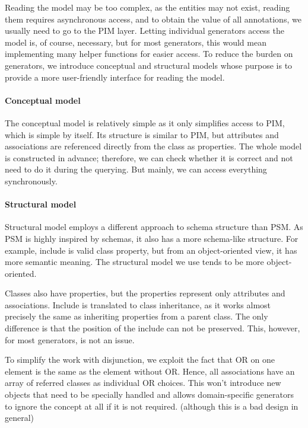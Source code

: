 Reading the model may be too complex, as the entities may not exist, reading them requires asynchronous access, and to obtain the value of all annotations, we usually need to go to the PIM layer. Letting individual generators access the model is, of course, necessary, but for most generators, this would mean implementing many helper functions for easier access. To reduce the burden on generators, we introduce conceptual and structural models whose purpose is to provide a more user-friendly interface for reading the model.

\paragraph{Conceptual model} The conceptual model is relatively simple as it only simplifies access to PIM, which is simple by itself. Its structure is similar to PIM, but attributes and associations are referenced directly from the class as properties. The whole model is constructed in advance; therefore, we can check whether it is correct and not need to do it during the querying. But mainly, we can access everything synchronously.

\paragraph{Structural model} Structural model employs a different approach to schema structure than PSM. As PSM is highly inspired by schemas, it also has a more schema-like structure. For example, include is valid class property, but from an object-oriented view, it has more semantic meaning. The structural model we use tends to be more object-oriented.

Classes also have properties, but the properties represent only attributes and associations. Include is translated to class inheritance, as it works almost precisely the same as inheriting properties from a parent class. The only difference is that the position of the include can not be preserved. This, however, for most generators, is not an issue.

To simplify the work with disjunction, we exploit the fact that OR on one element is the same as the element without OR. Hence, all associations have an array of referred classes as individual OR choices. This won't introduce new objects that need to be specially handled and allows domain-specific generators to ignore the concept at all if it is not required. (although this is a bad design in general)

